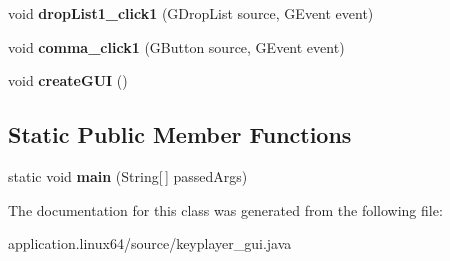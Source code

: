 \begin{DoxyCompactItemize}
\item 
\hypertarget{classkeyplayer__gui_a0fcc88c551f51dc5bf6cdf7464e06e99}{void {\bfseries drop\+List1\+\_\+click1} (G\+Drop\+List source, G\+Event event)}\label{classkeyplayer__gui_a0fcc88c551f51dc5bf6cdf7464e06e99}

\item 
\hypertarget{classkeyplayer__gui_aebf8fc3b2d71c89fc833cfced7cdcdf5}{void {\bfseries comma\+\_\+click1} (G\+Button source, G\+Event event)}\label{classkeyplayer__gui_aebf8fc3b2d71c89fc833cfced7cdcdf5}

\item 
\hypertarget{classkeyplayer__gui_a481022badc755a391818234a23deab44}{void {\bfseries create\+G\+U\+I} ()}\label{classkeyplayer__gui_a481022badc755a391818234a23deab44}

\end{DoxyCompactItemize}
\subsection*{Static Public Member Functions}
\begin{DoxyCompactItemize}
\item 
\hypertarget{classkeyplayer__gui_a2a38a02437acd9c3033e262e87bf8c29}{static void {\bfseries main} (String\mbox{[}$\,$\mbox{]} passed\+Args)}\label{classkeyplayer__gui_a2a38a02437acd9c3033e262e87bf8c29}

\end{DoxyCompactItemize}


The documentation for this class was generated from the following file\+:\begin{DoxyCompactItemize}
\item 
application.\+linux64/source/keyplayer\+\_\+gui.\+java\end{DoxyCompactItemize}
